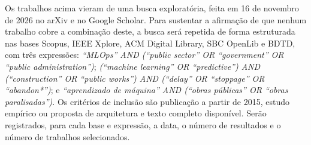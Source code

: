 Os trabalhos acima vieram de uma busca exploratória, feita em 16 de novembro de 2026 no arXiv e no Google Scholar. Para sustentar a afirmação de que nenhum trabalho cobre a combinação deste, a busca será repetida de forma estruturada nas bases Scopus, IEEE Xplore, ACM Digital Library, SBC OpenLib e BDTD, com três expressões: \textit{``MLOps'' AND (``public sector'' OR ``government'' OR ``public administration'')}; \textit{(``machine learning'' OR ``predictive'') AND (``construction'' OR ``public works'') AND (``delay'' OR ``stoppage'' OR ``abandon*'')}; e \textit{``aprendizado de máquina'' AND (``obras públicas'' OR ``obras paralisadas'')}. Os critérios de inclusão são publicação a partir de 2015, estudo empírico ou proposta de arquitetura e texto completo disponível. Serão registrados, para cada base e expressão, a data, o número de resultados e o número de trabalhos selecionados.

